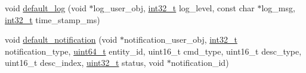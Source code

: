 \begin{DoxyCompactItemize}
\item 
void \hyperlink{namespaceavdecc__lib_a06217b3cf80ddb149800e7c9d1a451b6}{default\+\_\+log} (void $\ast$log\+\_\+user\+\_\+obj, \hyperlink{parse_8c_a37994e3b11c72957c6f454c6ec96d43d}{int32\+\_\+t} log\+\_\+level, const char $\ast$log\+\_\+msg, \hyperlink{parse_8c_a37994e3b11c72957c6f454c6ec96d43d}{int32\+\_\+t} time\+\_\+stamp\+\_\+ms)
\item 
void \hyperlink{namespaceavdecc__lib_a263af8efc15901a85fd68b82220ca251}{default\+\_\+notification} (void $\ast$notification\+\_\+user\+\_\+obj, \hyperlink{parse_8c_a37994e3b11c72957c6f454c6ec96d43d}{int32\+\_\+t} notification\+\_\+type, \hyperlink{parse_8c_aec6fcb673ff035718c238c8c9d544c47}{uint64\+\_\+t} entity\+\_\+id, uint16\+\_\+t cmd\+\_\+type, uint16\+\_\+t desc\+\_\+type, uint16\+\_\+t desc\+\_\+index, \hyperlink{parse_8c_a6eb1e68cc391dd753bc8ce896dbb8315}{uint32\+\_\+t} status, void $\ast$notification\+\_\+id)
\end{DoxyCompactItemize}

